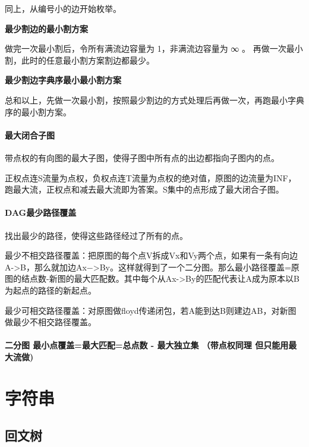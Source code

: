 \documentclass[a4paper,11pt]{article}
\begin{document}
     同上，从编号小的边开始枚举。
     
     \textbf{最少割边的最小割方案}
     
     做完一次最小割后，令所有满流边容量为 1，非满流边容量为 ∞ 。
     再做一次最小割，此时的任意最小割方案割边都最少。
     
     \textbf{最少割边字典序最小最小割方案}
     
     总和以上，先做一次最小割，按照最少割边的方式处理后再做一次，再跑最小字典序的最小割方案。
    
	\paragraph{最大闭合子图}
	带点权的有向图的最大子图，使得子图中所有点的出边都指向子图内的点。
	
	正权点连S流量为点权，负权点连T流量为点权的绝对值，原图的边流量为INF，跑最大流，正权点和减去最大流即为答案。S集中的点形成了最大闭合子图。
    
    \paragraph{DAG最少路径覆盖}
    找出最少的路径，使得这些路径经过了所有的点。
    
    最少不相交路径覆盖：把原图的每个点V拆成Vx和Vy两个点，如果有一条有向边A->B，那么就加边Ax−>By。这样就得到了一个二分图。那么最小路径覆盖=原图的结点数-新图的最大匹配数。其中每个从Ax->By的匹配代表让A成为原本以B为起点的路径的新起点。
    
   	最少可相交路径覆盖：对原图做floyd传递闭包，若A能到达B则建边AB，对新图做最少不相交路径覆盖。
   	
   \paragraph{二分图 最小点覆盖=最大匹配=总点数 - 最大独立集 （带点权同理 但只能用最大流做)}
   	






    \newpage
    \section{字符串}

    \subsection{回文树}
    \inputminted[breaklines]{c++}{String/pam.cpp}
\end{document}
